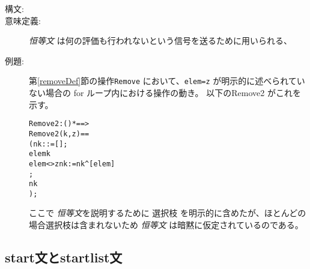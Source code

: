 \documentclass[\pformat,12pt]{jarticle}
\begin{document}
\begin{description}
\item[構文:]


\item[意味定義:]  {\it 恒等文\/} は何の評価も行われないという信号を送るために用いられる、

\item[例題:] 第\ref{removeDef}節の操作\texttt{Remove} において、\texttt{elem=z} が明示的に述べられていない場合の \textsf{for} ループ内における操作の動き。
以下の{Remove2} がこれを示す。
  \begin{alltt}
  Remove2 : () *  ==> 
  Remove2 (k,z) ==
    ( nk :  := [];
      elem  k 
        elem <> z  nk := nk^[elem]
       ;
      nk
    );
  \end{alltt}
ここで {\it 恒等文}を説明するために 選択枝 を明示的に含めたが、ほとんどの場合選択枝は含まれないため {\it 恒等文\/} は暗黙に仮定されているのである。

\end{description}

\subsection{start文とstartlist文}\label{sec:start}
\label{sc:startstmt}
\end{document}
